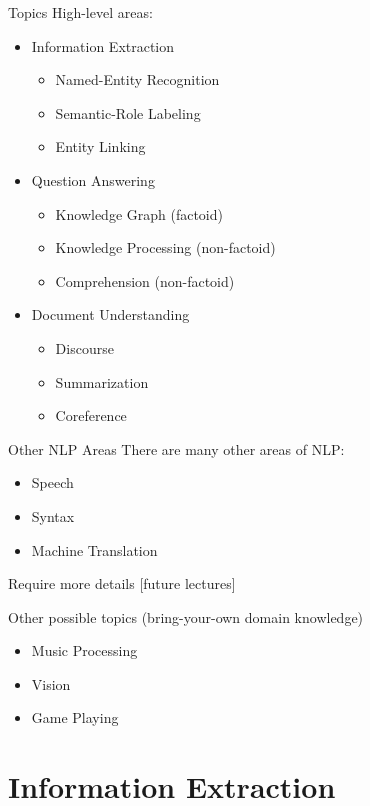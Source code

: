 \documentclass{beamer}
\begin{document}
\begin{frame}{Topics}
  High-level areas:
  \begin{itemize}
  \item Information Extraction
    \begin{itemize}
    \item Named-Entity Recognition
    \item Semantic-Role Labeling
    \item Entity Linking
    \end{itemize}
    \air 
  \item Question Answering
    \begin{itemize}
    \item Knowledge Graph (factoid)
    \item Knowledge Processing (non-factoid)
    \item Comprehension (non-factoid)
    \end{itemize}
  \item Document Understanding
    \begin{itemize}
    \item Discourse
    \item Summarization
    \item Coreference
    \end{itemize}
  \end{itemize}

\end{frame}

\begin{frame}{Other NLP Areas}
  There are many other areas of NLP:
  \begin{itemize}
  \item Speech
  \item Syntax
  \item Machine Translation
  \end{itemize}
  \air
  Require more details [future lectures]

  \air 
  Other possible topics (bring-your-own domain knowledge)
  \begin{itemize}
  \item Music Processing
  \item Vision
  \item Game Playing
  \end{itemize}
\end{frame}

\section{Information Extraction}
\end{document}
